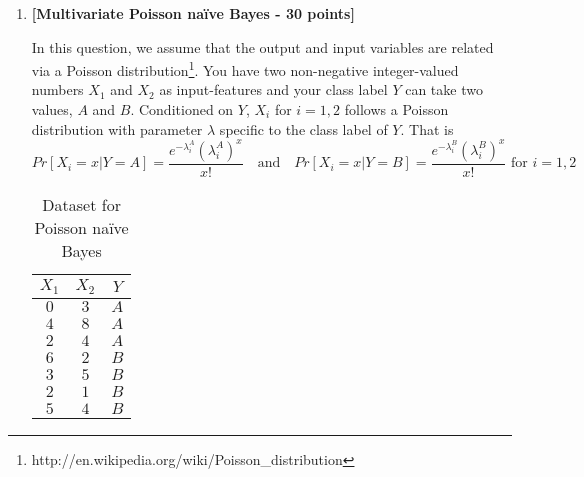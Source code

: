 \begin{enumerate}
\begin{enumerate}
\item Write down the expression for the log likelihood of the document $D_i$, 
$\log \Pr(D_i, y_i)$. 
\item Derive the expression for the maximum likelihood estimates for parameters $\alpha_1$, $\beta_1$, $\gamma_1$, 
$\alpha_0$, $\beta_0$, and $\gamma_0$.
\end{enumerate}

\textbf{Submission note:} You need not show the derivation of all six parameters separately. Some parameters are symmetric to others, and so, once you derive the expression for one, you can directly write down the expression for others. 

\textbf{Grading note: 10 points} for the derivation of one of the parameters, \textbf{5 points} each for the remaining five parameter expressions.

\item {\bf [Multivariate Poisson na\"ive Bayes - 30 points]}

In this question, we assume that the output and input variables are related via a Poisson distribution\footnote{http://en.wikipedia.org/wiki/Poisson\_distribution}.
You have two non-negative integer-valued numbers $X_1$ and $X_2$ as input-features and your class label $Y$ can take two values, $A$ and $B$.
Conditioned on $Y$, $X_i$ for $i=1,2$ follows a Poisson distribution with parameter $\lambda$ specific to the class label of $Y$. That is 
\[ Pr[X_i=x | Y = A] = \frac{e^{-\lambda^A_i} (\lambda^A_i)^x }{x!} ~~~\text{ and } ~~~ Pr[X_i=x | Y = B] = \frac{e^{-\lambda^B_i} (\lambda^B_i)^x }{x!} \text{ for } i =1,2 \]

\begin{table}[!h]
\begin{center}
\begin{tabular}{|c|c|c|}
\hline
$X_1$ & $X_2$ & $Y$ \\
\hline
$0$ & $3$ & $A$ \\
$4$ & $8$ & $A$ \\
$2$ & $4$ & $A$ \\
$6$ & $2$ & $B$ \\
$3$ & $5$ & $B$ \\
$2$ & $1$ & $B$ \\
$5$ & $4$ & $B$ \\
\hline
\end{tabular}
\caption{Dataset for Poisson na\"ive Bayes}
\label{tab:poissonNBdata}
\end{center}
\end{table}


\end{enumerate}
